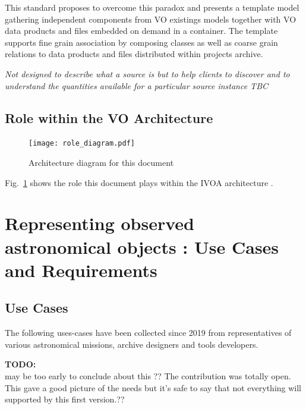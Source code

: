 \documentclass[11pt,a4paper]{ivoa}
\newcommand{\TODO}[1]{%
    \noindent%
    \colorbox{todocolor}{%
            \parbox{0.85\linewidth}{\sffamily \textbf{TODO:}\\
            #1}
    }%
    \vspace{2pt}

}
\begin{document}
This standard proposes to overcome this paradox and presents a template model gathering independent components from VO existings models 
together with VO data products and files embedded on demand in a container.
The template supports fine grain association by composing classes as well as coarse grain relations to data products and files distributed within projects archive.

\emph{Not designed to describe what a source is but to help clients to discover and to understand the quantities available for a particular source instance TBC}

\subsection{Role within the VO Architecture}

\begin{figure}
\centering


\texttt{[image: role\_diagram.pdf]}
\caption{Architecture diagram for this document}
\label{fig:archdiag}
\end{figure}

Fig.~\ref{fig:archdiag} shows the role this document plays within the
IVOA architecture \citep{note:VOARCH}.



\section{Representing observed astronomical objects : Use Cases and  Requirements}

\subsection{Use Cases}
The following uses-cases have been collected since 2019 from representatives of various astronomical missions, archive designers and tools developers.

\TODO{ may be too early to conclude about this ?? The contribution was totally open. 
This gave a good picture of the needs but it's safe to say that not everything will supported by this first version.??}
\end{document}
